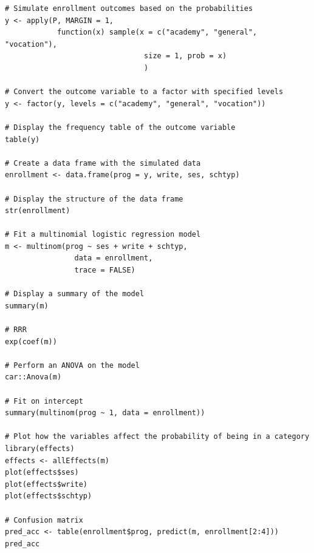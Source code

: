 \documentclass[12pt]{article}
\begin{document}
\begin{lstlisting}
# Simulate enrollment outcomes based on the probabilities
y <- apply(P, MARGIN = 1,
            function(x) sample(x = c("academy", "general", "vocation"),
                                size = 1, prob = x)
                                )

# Convert the outcome variable to a factor with specified levels
y <- factor(y, levels = c("academy", "general", "vocation"))

# Display the frequency table of the outcome variable
table(y)

# Create a data frame with the simulated data
enrollment <- data.frame(prog = y, write, ses, schtyp)

# Display the structure of the data frame
str(enrollment)

# Fit a multinomial logistic regression model
m <- multinom(prog ~ ses + write + schtyp,
                data = enrollment,
                trace = FALSE)

# Display a summary of the model
summary(m)

# RRR
exp(coef(m))

# Perform an ANOVA on the model
car::Anova(m)

# Fit on intercept
summary(multinom(prog ~ 1, data = enrollment))

# Plot how the variables affect the probability of being in a category
library(effects)
effects <- allEffects(m)
plot(effects$ses)
plot(effects$write)
plot(effects$schtyp)

# Confusion matrix
pred_acc <- table(enrollment$prog, predict(m, enrollment[2:4]))
pred_acc

\end{lstlisting}
\end{document}
